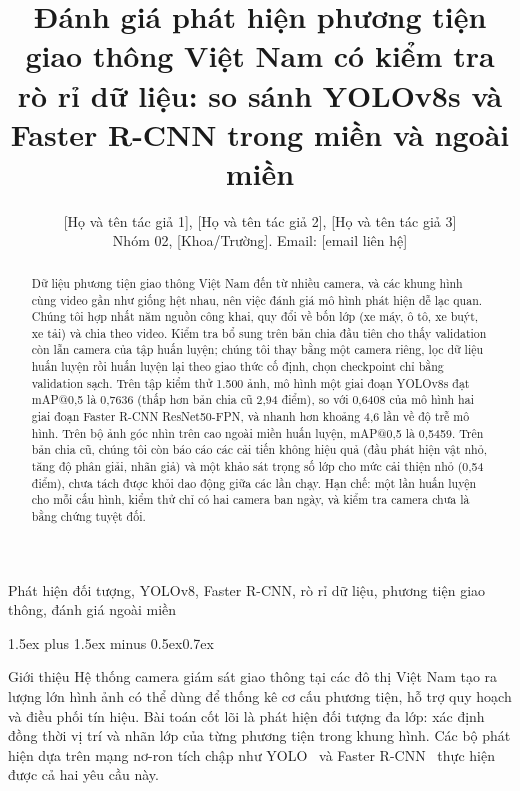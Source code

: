 \documentclass[10pt,journal,letterpaper]{IEEEtran}
\makeatletter
\renewcommand\section{\@startsection{section}{1}{\z@}%
  {1.5ex plus 1.5ex minus 0.5ex}{0.7ex}{\normalfont\scshape\raggedright}}
\makeatother
\begin{document}
\title{Đánh giá phát hiện phương tiện giao thông Việt Nam có kiểm tra rò rỉ dữ liệu: so sánh YOLOv8s và Faster R-CNN trong miền và ngoài miền}

\author{[Họ và tên tác giả 1], [Họ và tên tác giả 2], [Họ và tên tác giả 3]\\
Nhóm 02, [Khoa/Trường]. Email: [email liên hệ]}

\maketitle

\begin{abstract}
Dữ liệu phương tiện giao thông Việt Nam đến từ nhiều camera, và các khung hình cùng video gần như giống hệt nhau, nên việc đánh giá mô hình phát hiện dễ lạc quan. Chúng tôi hợp nhất năm nguồn công khai, quy đổi về bốn lớp (xe máy, ô tô, xe buýt, xe tải) và chia theo video. Kiểm tra bổ sung trên bản chia đầu tiên cho thấy validation còn lẫn camera của tập huấn luyện; chúng tôi thay bằng một camera riêng, lọc dữ liệu huấn luyện rồi huấn luyện lại theo giao thức cố định, chọn checkpoint chỉ bằng validation sạch. Trên tập kiểm thử 1.500 ảnh, mô hình một giai đoạn YOLOv8s đạt mAP@0,5 là 0,7636 (thấp hơn bản chia cũ 2,94 điểm), so với 0,6408 của mô hình hai giai đoạn Faster R-CNN ResNet50-FPN, và nhanh hơn khoảng 4,6 lần về độ trễ mô hình. Trên bộ ảnh góc nhìn trên cao ngoài miền huấn luyện, mAP@0,5 là 0,5459. Trên bản chia cũ, chúng tôi còn báo cáo các cải tiến không hiệu quả (đầu phát hiện vật nhỏ, tăng độ phân giải, nhãn giả) và một khảo sát trọng số lớp cho mức cải thiện nhỏ (0,54 điểm), chưa tách được khỏi dao động giữa các lần chạy. Hạn chế: một lần huấn luyện cho mỗi cấu hình, kiểm thử chỉ có hai camera ban ngày, và kiểm tra camera chưa là bằng chứng tuyệt đối.
\end{abstract}

\begin{IEEEkeywords}
Phát hiện đối tượng, YOLOv8, Faster R-CNN, rò rỉ dữ liệu, phương tiện giao thông, đánh giá ngoài miền
\end{IEEEkeywords}

\section{Giới thiệu}
Hệ thống camera giám sát giao thông tại các đô thị Việt Nam tạo ra lượng lớn hình ảnh có thể dùng để thống kê cơ cấu phương tiện, hỗ trợ quy hoạch và điều phối tín hiệu. Bài toán cốt lõi là phát hiện đối tượng đa lớp: xác định đồng thời vị trí và nhãn lớp của từng phương tiện trong khung hình. Các bộ phát hiện dựa trên mạng nơ-ron tích chập như YOLO~\cite{yolo} và Faster R-CNN~\cite{frcnn} thực hiện được cả hai yêu cầu này.
\end{document}
